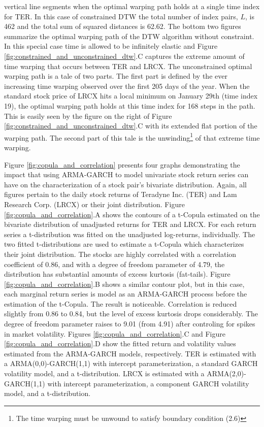 \documentclass[12pt]{report}
\begin{document}
vertical line segments when the optimal warping path holds at a single time index for TER. In this case of constrained DTW the total number of index pairs, $L$, is 462 and the total sum of squared distances is 62.62. The bottom two figures summarize the optimal warping path of the DTW algorithm without constraint. In this special case time is allowed to be infinitely elastic and Figure \ref{fig:constrained_and_unconstrained_dtw}.C captures the extreme amount of time warping that occurs between TER and LRCX. The unconstrained optimal warping path is a tale of two parts. The first part is defined by the ever increasing time warping observed over the first 205 days of the year. When the standard stock price of LRCX hits a local minimum on January 29th (time index 19), the optimal warping path holds at this time index for 168 steps in the path. This is easily seen by the figure on the right of Figure \ref{fig:constrained_and_unconstrained_dtw}.C with its extended flat portion of the warping path. The second part of this tale is the unwinding\footnote{The time warping must be unwound to satisfy boundary condition (2.6)} of that extreme time warping.

Figure \ref{fig:copula_and_correlation} presents four graphs demonstrating the impact that using ARMA-GARCH to model univariate stock return series can have on the characterization of a stock pair's bivariate distribution. Again, all figures pertain to the daily stock returns of Teradyne Inc. (TER) and Lam Research Corp. (LRCX) or their joint distribution. Figure \ref{fig:copula_and_correlation}.A shows the contours of a t-Copula estimated on the bivariate distribution of unadjusted returns for TER and LRCX. For each return series a t-distribution was fitted on the unadjusted log-returns, individually. The two fitted t-distributions are used to estimate a t-Copula which characterizes their joint distribution. The stocks are highly correlated with a correlation coefficient of 0.86, and with a degree of freedom parameter of 4.79, the distribution has substantial amounts of excess kurtosis (fat-tails). Figure \ref{fig:copula_and_correlation}.B shows a similar contour plot, but in this case, each marginal return series is model as an ARMA-GARCH process before the estimation of the t-Copula. The result is noticeable. Correlation is reduced slightly from 0.86 to 0.84, but the level of excess kurtosis drops considerably. The degree of freedom parameter raises to 9.01 (from 4.91) after controling for spikes in market volatility. Figures \ref{fig:copula_and_correlation}.C and Figure \ref{fig:copula_and_correlation}.D show the fitted return and volatility values estimated from the ARMA-GARCH models, respectively. TER is estimated with a ARMA(0,0)-GARCH(1,1) with intercept parameterization, a standard GARCH volatility model, and a t-distribution. LRCX is estimated with a ARMA(2,0)-GARCH(1,1) with intercept parameterization, a component GARCH volatility model, and a t-distribution.
\end{document}
